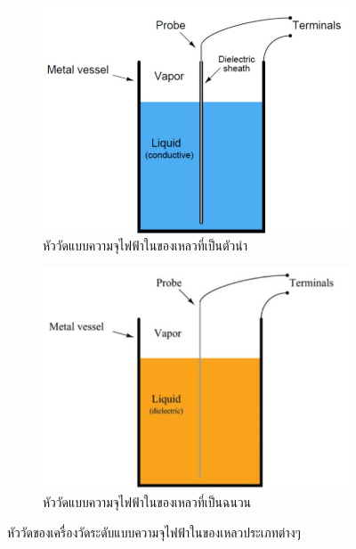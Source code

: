 \documentclass[final,11pt,a4paper]{article}
\begin{document}
\begin{figure}[h]
    \begin{subfigure}[b]{0.48\textwidth}
        \centering
        \includegraphics[width=\textwidth]{images/Screenshot_24.jpg}
        \caption{หัววัดแบบความจุไฟฟ้าในของเหลวที่เป็นตัวนำ}
        \label{fig:cld1}
    \end{subfigure}
    \hfill
    \begin{subfigure}[b]{0.48\textwidth}
        \centering
        \includegraphics[width=\textwidth]{images/Screenshot_25.jpg}
        \caption{หัววัดแบบความจุไฟฟ้าในของเหลวที่เป็นฉนวน}
        \label{fig:cld2}
    \end{subfigure}
    \hfill
    \caption{หัววัดของเครื่องวัดระดับแบบความจุไฟฟ้าในของเหลวประเภทต่างๆ}
    \label{fig:cld}
\end{figure}
\end{document}
